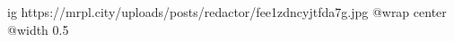  
 
 
 
 

\ifcmt
  ig https://mrpl.city/uploads/posts/redactor/fee1zdncyjtfda7g.jpg
  @wrap center
  @width 0.5
\fi
